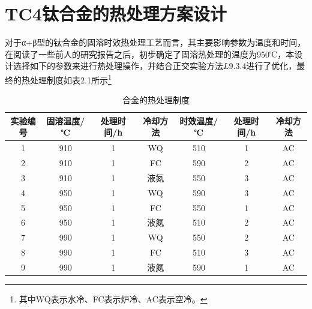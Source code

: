 
\section{TC4钛合金的热处理方案设计}
对于α+β型的\ti 钛合金的固溶时效热处理工艺而言，其主要影响参数为温度和时间，在阅读了一些前人的研究报告\cite{mirror1}\cite{mirror2}之后，初步确定了固溶热处理的温度为950℃，本设计选择如下的参数来进行热处理操作，并结合正交实验方法$ L9.3.4 $进行了优化，最终的热处理制度如表2.1所示\footnote{其中WQ表示水冷、FC表示炉冷、AC表示空冷。}
\begin{table}[htbp]
	\centering
	\label{sec:myHT}
	\caption{\ti 合金的热处理制度}
\begin{tabular}{ccccccc}
	\toprule
		实验编号&固溶温度/℃ &处理时间/h & 冷却方法 & 时效温度/℃  &处理时间/h & 冷却方法 \\
	\midrule
	1 & 910 & 1 & WQ & 510 & 1 & AC \\
	2 & 910 & 1 & FC & 590 & 2 & AC \\
	3 & 910 & 1 & 液氮 & 550 & 3 & AC \\
	4 & 950 & 1 & WQ & 590 & 3 & AC \\
	5 & 950 & 1 & FC & 550 & 1 & AC \\
	6 & 950 & 1 & 液氮 & 510 & 2 & AC \\
	7 & 990 & 1 & WQ & 550 & 2 & AC \\
	8 & 990 & 1 & FC & 510 & 3 & AC \\
	9 & 990 & 1 & 液氮 & 590 & 1 & AC \\

\end{tabular}
\end{table}
